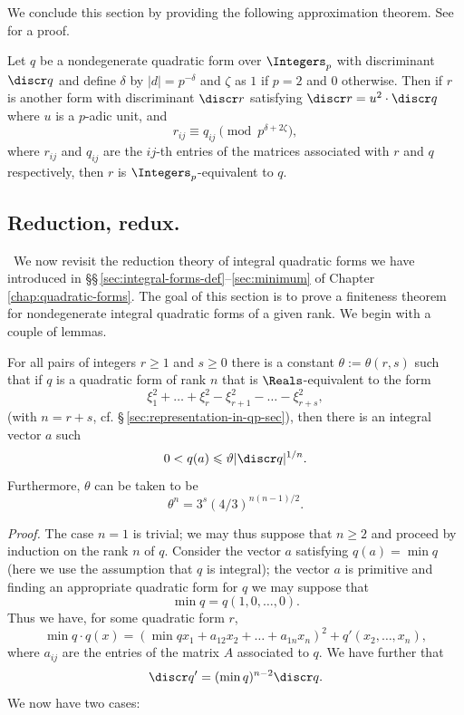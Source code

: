 We conclude this section by providing the following approximation theorem. See
\cite[p.\,126--127]{cassels2008rational} for a proof.

\begin{theoremx}\label{thm:approximation-zp} Let \(q\) be a nondegenerate
    quadratic form over \(\Integers_p\) with discriminant \(\discr q\) and
    define \(\delta\) by \(|d| = p^{-\delta}\) and \(\zeta\) as \(1\) if \(p =
    2\) and \(0\) otherwise. Then if \(r\) is another form with discriminant
    \(\discr r\) satisfying \(\discr r = u^2\cdot \discr q\) where \(u\) is a
    \(p\)-adic unit, and
    \[
        r_{ij} \equiv q_{ij} \pmod{p^{\delta + 2\zeta}},  
    \]
    where \(r_{ij}\) and \(q_{ij}\) are the \(ij\)-th entries of the matrices
    associated with \(r\) and \(q\) respectively, then \(r\) is
    \(\Integers_p\)-equivalent to \(q\).
\end{theoremx}

\subsection{Reduction, redux.}~We now revisit the reduction theory of integral
quadratic forms we have introduced in
\S\S\,\ref{sec:integral-forms-def}--\ref{sec:minimum} of
Chapter\,\ref{chap:quadratic-forms}. The goal of this section is to prove a
finiteness theorem for nondegenerate integral quadratic forms of a given rank.
We begin with a couple of lemmas.\label{sec:integral-reduction-redux}

\begin{lemmax}\label{lemma:theta-inequality}
    {\normalfont\cite[p.\,136]{cassels2008rational}} For all pairs of integers
    \(r \geq 1\) and \(s \geq 0\) there is a constant \(\theta := \theta(r, s)\)
    such that if \(q\) is a quadratic form of rank \(n\) that is
    \(\Reals\)-equivalent to the form
    \[
        \xi_1^2 + \dots + \xi_r^2 - \xi_{r+1}^2 - \dots - \xi_{r+s}^2,
    \]
    (with \(n = r + s\), cf. \S\,\ref{sec:representation-in-qp-sec}), then there
    is an integral vector \(a\) such
    \[
        0 < q(a) \leq \theta |\discr q|^{1/n}.
    \]
    Furthermore, \(\theta\) can be taken to be
    \begin{equation}
        \label{eq:theta-inequality}
        \theta^n = 3^s (4/3)^{n(n-1)/2}.
    \end{equation}
\end{lemmax}

\emph{Proof.} The case \(n = 1\) is trivial; we may thus suppose that \(n \geq
2\) and proceed by induction on the rank \(n\) of \(q\). Consider the vector
\(a\) satisfying \(q(a) = \min q\) (here we use the assumption that \(q\) is
integral); the vector \(a\) is primitive and finding an appropriate quadratic
form for \(q\) we may suppose that
\[
    \min q = q(1, 0, \dots, 0).
\]
Thus we have, for some quadratic form \(r\),
\[
    \min q \cdot q(x) =(\min q x_1 + a_{12} x_2 + \dots + a_{1n} x_n)^2 + q'(x_2, \dots, x_n),
\]
where \(a_{ij}\) are the entries of the matrix \(A\) associated to \(q\). We
have further that
\[
    \discr q' = (\min q)^{n-2}\discr q.
\]
We now have two cases:

